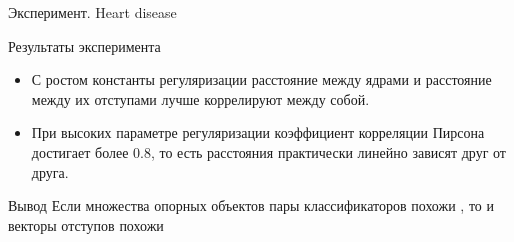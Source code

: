 \documentclass{beamer}
\begin{document}
\begin{frame}{Эксперимент. Heart disease}



\end{frame}
\begin{frame}{Результаты эксперимента}
\begin{itemize}
  \item С ростом константы регуляризации расстояние между ядрами и расстояние между
  их отступами лучше коррелируют между собой.
  \item При высоких параметре регуляризации коэффициент корреляции Пирсона 
  достигает более $0.8$, то есть расстояния практически линейно зависят друг от друга.
\end{itemize} 

    \begin{block}{Вывод}
Если множества опорных объектов пары классификаторов похожи
    , то и векторы отступов похожи
    \end{block}
\end{frame}
\newcommand{\Xtrain}{X_\text{train}}
\newcommand{\Xval}{X_\text{val}}
\newcommand{\Xtest}{X_\text{test}}
\newcommand{\ytrain}{y_\text{train}}
\newcommand{\yval}{y_\text{val}}
\newcommand{\ytest}{y_\text{test}}
\newcommand{\SVM}{\mathrm{SVM}}
\newcommand{\Logregr}{\mathrm{Logregr}}
\newcommand{\predictprobability}{\mathrm{predict\_probability}}
\newcommand{\fit}{\mathrm{fit}}
\newcommand{\margin}{\mathrm{margin}}
\end{document}
